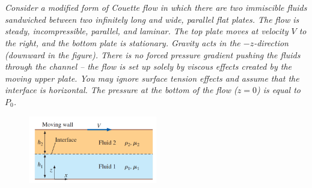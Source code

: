 \section{}
\textit{Consider a modified form of Couette flow in which there are two immiscible fluids sandwiched between two infinitely long and wide, parallel flat plates. The flow is steady, incompressible, parallel, and laminar. The top plate moves at velocity $V$ to the right, and the bottom plate is stationary. Gravity acts in the $-z$-direction (downward in the figure). There is no forced pressure gradient pushing the fluids through the channel – the flow is set up solely by viscous effects created by the moving upper plate. You may ignore surface tension effects and assume that the interface is horizontal. The pressure at the bottom of the flow ($z = 0$) is equal to $P_0$.}

\begin{figure}[h]
    \centering
    \includegraphics[width=0.5\textwidth]{Questions/Figures/Q3 Problem Diagram.png}
\end{figure}

